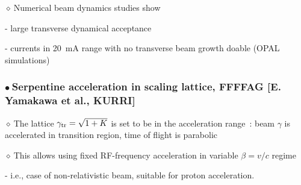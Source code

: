 \documentclass[12pt]{article}
\newcommand{\nib}{\noindent \ensuremath{\bullet~}}
\newcommand{\nid}{\noindent \ensuremath{\diamond~}}
\newcommand{\black}{\color{black}}
\newcommand{\blue}{\color{blue}}
\begin{document}
\black
\nid Numerical beam dynamics studies show 

\blue
\medskip 

- large transverse dynamical acceptance 

- currents in  20~mA range with no transverse beam growth doable  (OPAL simulations)




\clearpage

\LARGE

\black
\subsubsection*{\LARGE \nib \bf Serpentine acceleration  in scaling lattice, FFFFAG [E. Yamakawa et al., KURRI]}



\blue
\nid  The lattice $\gamma_{\rm tr}=\sqrt{1+K}$ is set to be in the acceleration range~: 
beam $\gamma$ is accelerated in transition region, time of flight is parabolic 

\smallskip
\black
\nid This allows using fixed RF-frequency acceleration in \blue variable $\beta=v/c$ regime \black 

- i.e., case of non-relativistic beam, suitable for proton acceleration.

\rm \black

~
\end{document}

